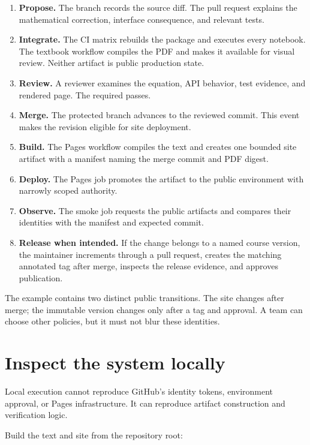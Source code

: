 \begin{enumerate}
  \item \textbf{Propose.} The branch records the source diff. The pull request
  explains the mathematical correction, interface consequence, and relevant
  tests.
  \item \textbf{Integrate.} The CI matrix rebuilds the package and executes
  every notebook. The textbook workflow compiles the PDF and makes it available
  for visual review. Neither artifact is public production state.
  \item \textbf{Review.} A reviewer examines the equation, API behavior, test
  evidence, and rendered page. The required  passes.
  \item \textbf{Merge.} The protected branch advances to the reviewed commit.
  This event makes the revision eligible for site deployment.
  \item \textbf{Build.} The Pages workflow compiles the text and creates one
  bounded site artifact with a manifest naming the merge commit and PDF digest.
  \item \textbf{Deploy.} The Pages job promotes the artifact to the public
  environment with narrowly scoped authority.
  \item \textbf{Observe.} The smoke job requests the public artifacts and
  compares their identities with the manifest and expected commit.
  \item \textbf{Release when intended.} If the change belongs to a named course
  version, the maintainer increments  through a pull
  request, creates the matching annotated tag after merge, inspects the release
  evidence, and approves publication.
\end{enumerate}

The example contains two distinct public transitions. The site changes after
merge; the immutable version changes only after a tag and approval. A team can
choose other policies, but it must not blur these identities.

\section{Inspect the system locally}

Local execution cannot reproduce GitHub's identity tokens, environment
approval, or Pages infrastructure. It can reproduce artifact construction and
verification logic.

Build the text and site from the repository root:

